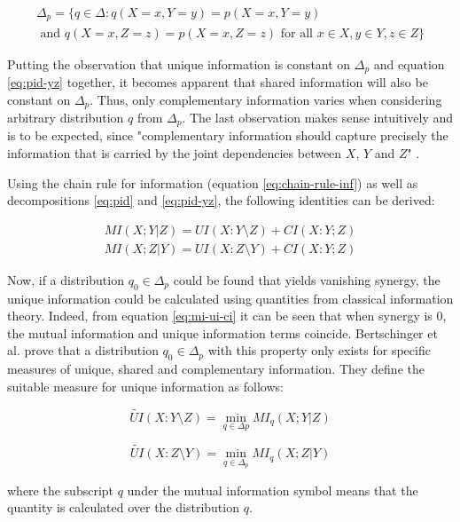 \documentclass[12pt]{article}
\begin{document}
\begin{multline*}
\Delta_p = \{q \in \Delta: q(X=x, Y=y) = p(X=x, Y=y) \\ 
\text{ and }  q(X=x, Z=z) = p(X=x, Z=z) \text{ for all } x \in X, y \in Y, z \in Z\}
\end{multline*}

Putting the observation that unique information is constant on $\Delta_p$ and equation \ref{eq:pid-yz} together, it becomes apparent that shared information will also be constant on $\Delta_p$. Thus, only complementary information varies when considering arbitrary distribution $q$ from $\Delta_p$. The last observation makes sense intuitively and is to be expected, since "complementary information should capture precisely the information that is carried by the joint dependencies between $X$, $Y$ and $Z$" \cite{bertschinger}. 

Using the chain rule for information (equation \ref{eq:chain-rule-inf}) as well as decompositions \ref{eq:pid} and \ref{eq:pid-yz}, the following identities can be derived: 

\begin{align}
MI(X;Y|Z) = UI(X:Y \setminus Z) + CI(X:Y;Z) \nonumber \\ 
MI(X;Z|Y) = UI(X:Z \setminus Y) + CI(X:Y;Z)
\label{eq:mi-ui-ci}
\end{align}

Now, if a distribution $q_0 \in \Delta_p$ could be found that yields vanishing synergy, the unique information could be calculated using quantities from classical information theory. Indeed, from equation \ref{eq:mi-ui-ci} it can be seen that when synergy is $0$, the mutual information and unique information terms coincide. Bertschinger et al. \cite{bertschinger} prove that a distribution $q_0 \in \Delta_p$ with this property only exists for specific measures of unique, shared and complementary information. They define the suitable measure for unique information as follows:

\begin{equation}
\widetilde{UI}(X:Y \setminus Z) = \min_{q \in \Delta p} MI_q(X;Y|Z)
\label{eq:tilde_ui_y}
\end{equation}

\begin{equation}
\widetilde{UI}(X:Z \setminus Y) = \min_{q \in \Delta_p} MI_q(X;Z|Y)
\label{eq:tilde_ui_z}
\end{equation}

where the subscript $q$ under the mutual information symbol means that the quantity is calculated over the distribution $q$.
\end{document}
